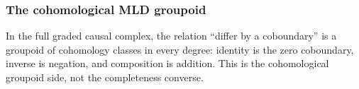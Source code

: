 \subsubsection{The cohomological MLD groupoid}

\begin{theorem}\label{thm:cohomological-mld-groupoid}\leanok{}
In the full graded causal complex, the relation ``differ by a coboundary'' is a
groupoid of cohomology classes in every degree: identity is the zero
coboundary, inverse is negation, and composition is addition. This is the
cohomological groupoid side, not the completeness converse.
\end{theorem}
